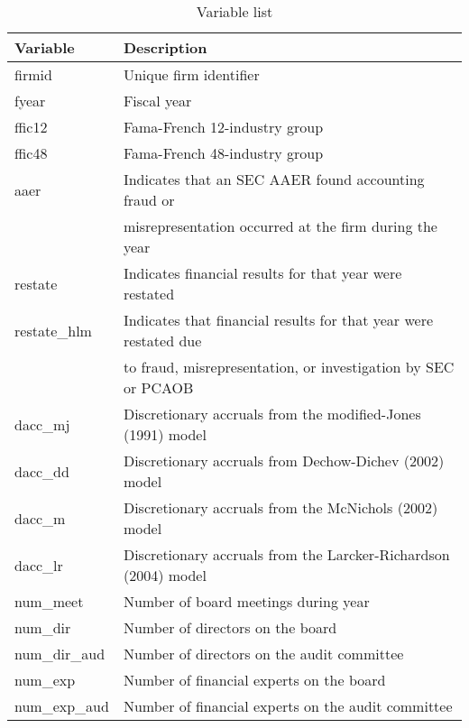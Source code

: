 \documentclass[11pt]{amsart}
\begin{document}
\begin{table}[h]
\caption{Variable list} \label{tab:vars}
    \begin{tabular}{ll}
    \textbf{Variable} & \textbf{Description } \\
    \hline
        firmid        & Unique firm identifier \\
        fyear         & Fiscal year \\
        ffic12        & Fama-French 12-industry group  \\
        ffic48        & Fama-French 48-industry group \\
        aaer          & Indicates that an SEC AAER found accounting fraud or  \\
                      & misrepresentation occurred at the firm during the year \\
        restate       & Indicates financial results for that year were restated \\
        restate\_hlm  & Indicates that financial results for that year were restated due \\
                      & to fraud, misrepresentation, or investigation by SEC or PCAOB \\
        dacc\_mj      & Discretionary accruals from the modified-Jones (1991) model \\
        dacc\_dd      &    Discretionary accruals from Dechow-Dichev (2002) model \\
        dacc\_m       & Discretionary accruals from the McNichols (2002) model \\
        dacc\_lr      &    Discretionary accruals from the Larcker-Richardson (2004) model \\
        num\_meet     & Number of board meetings during year \\
        num\_dir      & Number of directors on the board \\
        num\_dir\_aud & Number of directors on the audit committee \\
        num\_exp      & Number of financial experts on the board \\
        num\_exp\_aud & Number of financial experts on the audit committee 
\end{tabular}    
\end{table}



\end{document}
